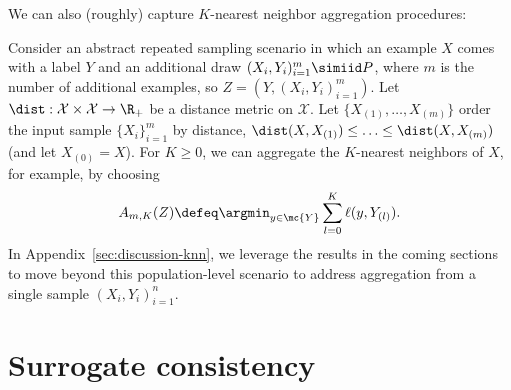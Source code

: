 \documentclass[11pt]{article}
\newcommand{\sX}{\mathcal{X}} %
\newcommand{\tloss}{\ell}  %
\begin{document}
We can also (roughly) capture $K$-nearest neighbor aggregation procedures:

\begin{example} \label{example:knn}
  Consider an abstract repeated sampling scenario in which an example $X$
  comes with a label $Y$ and an additional draw $(X_i, Y_i)_{i = 1}^m
  \simiid P$, where $m$ is the number of additional examples, so $Z = (Y,
  (X_i, Y_i)_{i = 1}^m)$.  Let $\dist: \sX \times \sX \to \R_+$ be a
  distance metric on $\sX$.
  Let $\{X_{(1)}, \ldots, X_{(m)}\}$ order the input sample $\{X_i\}_{i=1}^m$
  by distance, $\dist(X,X_{(1)}) \leq \ldots \leq \dist(X,X_{(m)})$ (and let
  $X_{(0)} = X$).
  For $K \geq 0$, we can aggregate the
  $K$-nearest neighbors of $X$, for example, by choosing
  \begin{align*}
    A_{m,K}(Z) \defeq
    \argmin_{y \in \mc{Y}} \sum_{l = 0}^K \tloss(y, Y_{(l)}). %
  \end{align*}
  In Appendix~\ref{sec:discussion-knn}, we leverage the results in the
  coming sections to move beyond this population-level scenario to address
  aggregation from a single sample $(X_i, Y_i)_{i = 1}^n$.
\end{example}
%


\section{Surrogate consistency}
\end{document}
